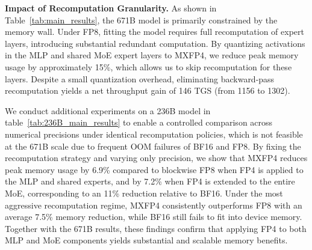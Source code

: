 \textbf{Impact of Recomputation Granularity.}
As shown in Table~\ref{tab:main_results}, the 671B model is primarily constrained by the memory wall. Under FP8, fitting the model requires full recomputation of expert layers, introducing substantial redundant computation. By quantizing activations in the MLP and shared MoE expert layers to MXFP4, we reduce peak memory usage by approximately 15\%, which allows us to skip recomputation for these layers. Despite a small quantization overhead, eliminating backward-pass recomputation yields a net throughput gain of 146 TGS (from 1156 to 1302).


\begin{table}[!htbp]
\centering
{}
\caption{Performance on 671B MoE Model.}
\label{tab:main_results}
\end{table}

We conduct additional experiments on a 236B model in table~\ref{tab:236B_main_results} to enable a controlled comparison across numerical precisions under identical recomputation policies, which is not feasible at the 671B scale due to frequent OOM failures of BF16 and FP8. By fixing the recomputation strategy and varying only precision, we show that MXFP4 reduces peak memory usage by 6.9\% compared to blockwise FP8 when FP4 is applied to the MLP and shared experts, and by 7.2\% when FP4 is extended to the entire MoE, corresponding to an 11\% reduction relative to BF16. Under the most aggressive recomputation regime, MXFP4 consistently outperforms FP8 with an average 7.5\% memory reduction, while BF16 still fails to fit into device memory. Together with the 671B results, these findings confirm that applying FP4 to both MLP and MoE components yields substantial and scalable memory benefits.

